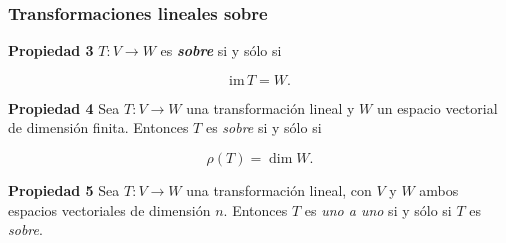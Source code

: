 {\nologo 
\begin{frame}\frametitle{Transformaciones lineales sobre}

\begin{prop}{\textbf{Propiedad 3}}
	\justifying
	$T:V\to W$ es \textbf{\textit{sobre}} si y sólo si
	
	\vspace{-2mm}
	\[
	\text{im}\,T = W.
	\]
\end{prop}	

\begin{prop}{\textbf{Propiedad 4}}
	\justifying
	Sea $T:V\to W$ una transformación lineal y $W$ un espacio vectorial de dimensión finita. Entonces $T$ es \textit{sobre} 
	si y sólo si
	
	\vspace{-2mm}
	\[
		\rho(T) = \dim W.
	\]
\end{prop}	

\begin{prop}{\textbf{Propiedad 5}}
	\justifying
	Sea $T:V\to W$ una transformación lineal, con $V$ y $W$ ambos espacios vectoriales de dimensión $n$. Entonces $T$ es \textit{uno a uno} 
	si y sólo si $T$ es \textit{sobre}.
\end{prop}	

\end{frame}
}


\subsection{}


